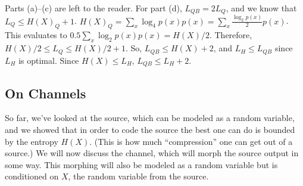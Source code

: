 \documentclass[11pt]{article}
\theoremstyle{definition}
\begin{document}
Parts (a)--(c) are left to the reader. For part (d), $L_{QB} = 2L_{Q}$, and we know that $L_Q \leq H(X)_Q + 1$. $H(X)_Q = \sum_x \log_4 p(x) p(x) = \sum_x \frac{\log_2p(x)}{2} p(x)$. This evaluates to $0.5 \sum_x \log_2 p(x) p(x) = H(X)/2$. Therefore, $H(X)/2 \leq L_Q \leq H(X)/2 + 1$. So, $L_{QB} \leq H(X) + 2$, and $L_H \leq L_{QB}$ since $L_H$ is optimal. Since $H(X) \leq L_H$, $L_{QB} \leq L_H + 2$. 

\subsection{On Channels}
So far, we've looked at the source, which can be modeled as a random variable, and we showed that in order to code the source the best one can do is bounded by the entropy $H(X)$. (This is how much ``compression'' one can get out of a source.) We will now discuss the channel, which will morph the source output in some way. This morphing will also be modeled as a random variable but is conditioned on $X$, the random variable from the source. 




%
\end{document}

